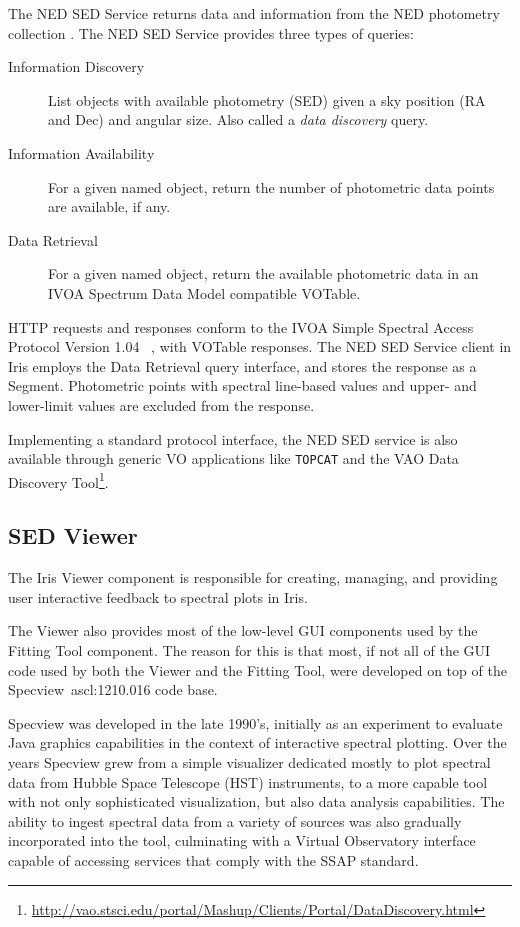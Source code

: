 \documentclass[final,5p,authoryear]{elsarticle}
\begin{document}
The NED SED Service returns data and information from the NED photometry
collection \citep{2007ASPC..376..153M}. The NED SED Service provides three types
of queries:

\begin{description}
\item[Information Discovery] List objects with
available photometry (SED) given a sky position (RA and Dec) and angular size.
Also called a \emph{data discovery} query. 
\item[Information Availability] For
a given named object, return the number of photometric data points are
available, if any.
\item[Data Retrieval] For a given named object, return the
available photometric data in an IVOA Spectrum Data Model compatible VOTable.
\end{description}

HTTP requests and responses conform to the IVOA Simple Spectral Access Protocol
Version 1.04 ~\citep[SSAP;][]{2012arXiv1203.5725T}, with VOTable responses. The
NED SED Service client in Iris
employs the Data Retrieval query interface, and stores the
response as a Segment. Photometric points with spectral line-based values and
upper- and lower-limit values are excluded from the response.

Implementing a standard protocol interface, the NED SED service is also
available through generic VO applications like \texttt{TOPCAT} and the VAO Data Discovery
Tool\footnote{\url{http://vao.stsci.edu/portal/Mashup/Clients/Portal/DataDiscovery.html}}.

\subsection{SED Viewer} \label{subsec:specview}
The Iris Viewer component is responsible for creating, managing, and providing
user interactive feedback to spectral plots in Iris.

The Viewer also provides most of the low-level GUI
components used by the Fitting Tool component. The reason for this is that most,
if not all of the GUI code used by both the Viewer and the Fitting Tool, were
developed on top of the Specview~ascl:1210.016 \citep{2002ASPC..281..120B} code base.

Specview was developed in the late 1990's, initially as an experiment to evaluate
Java graphics capabilities in the context of interactive spectral plotting. Over
the years Specview grew from a simple visualizer dedicated mostly to plot
spectral data from Hubble Space Telescope (HST) instruments, to a more capable
tool with not only sophisticated visualization, but also data analysis
capabilities. The ability to ingest spectral data from a variety of sources was
also gradually incorporated into the tool, culminating with a Virtual
Observatory interface capable of accessing services that comply with the
SSAP standard.
\end{document}
